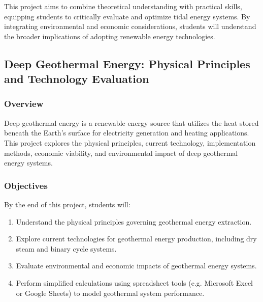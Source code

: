 \documentclass[11pt]{article}
\begin{document}
This project aims to combine theoretical understanding with practical skills, equipping students to critically evaluate and optimize tidal energy systems. By integrating environmental and economic considerations, students will understand the broader implications of adopting renewable energy technologies.
\newpage
\subsection{Deep Geothermal Energy: Physical Principles and Technology Evaluation}

\subsubsection*{Overview}
Deep geothermal energy is a renewable energy source that utilizes the heat stored beneath the Earth's surface for electricity generation and heating applications. This project explores the physical principles, current technology, implementation methods, economic viability, and environmental impact of deep geothermal energy systems.

\subsubsection*{Objectives}
By the end of this project, students will:
\begin{enumerate}
    \item Understand the physical principles governing geothermal energy extraction.
    \item Explore current technologies for geothermal energy production, including dry steam and binary cycle systems.
    \item Evaluate environmental and economic impacts of geothermal energy systems.
    \item Perform simplified calculations using spreadsheet tools (e.g. Microsoft Excel or Google Sheets) to model geothermal system performance.
\end{enumerate}
\end{document}
